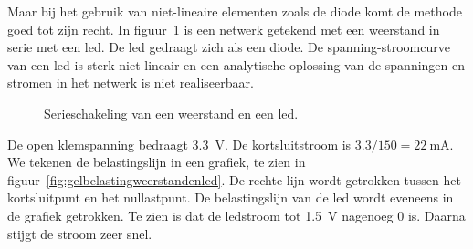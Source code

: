 Maar bij het gebruik van niet-lineaire elementen zoals de diode komt de methode goed tot zijn recht.
In figuur~\ref{fig:gelserieweerstandenled} is een netwerk getekend met een weerstand in serie met een
led. De led gedraagt zich als een diode. De spanning-stroomcurve van een led is sterk niet-lineair en een
analytische oplossing van de spanningen en stromen in het netwerk is niet realiseerbaar.

\begin{figure}[H]
\centering
{}
\caption{Serieschakeling van een weerstand en een led.}
\label{fig:gelserieweerstandenled}
\end{figure}

De open klemspanning bedraagt \SI{3.3}{\volt}. De kortsluitstroom is $\num{3.3}/\num{150} = \SI{22}{\milli\ampere}$.
We tekenen de belastingslijn in een grafiek, te zien in figuur~\ref{fig:gelbelastingweerstandenled}.
De rechte lijn wordt getrokken tussen het kortsluitpunt en het nullastpunt. De belastingslijn van
de led wordt eveneens in de grafiek getrokken. Te zien is dat de ledstroom tot \SI{1.5}{\volt} nagenoeg 0 is.
Daarna stijgt de stroom zeer snel. 
 
